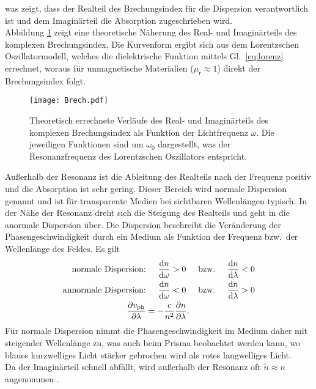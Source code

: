 was zeigt, dass der Realteil des Brechungsindex für die Dispersion verantwortlich ist und dem Imaginärteil die Absorption zugeschrieben wird. \\
Abbildung \ref{fig:brech} zeigt eine theoretische Näherung des Real- und Imaginärteils des komplexen Brechungsindex.
Die Kurvenform ergibt sich aus dem Lorentzschen Oszillatormodell, welches die dielektrische Funktion mittels Gl.~\eqref{eq:lorenz}
errechnet, woraus für unmagnetische Materialien ($\mu_{\text{r}} \approx 1$) direkt der Brechungsindex folgt. 
\begin{figure}[h!]
    \centering
    \texttt{[image: Brech.pdf]}
    \caption{\label{fig:brech}Theoretisch errechnete Verläufe des Real- und Imaginärteils des 
    komplexen Brechungsindex als Funktion der Lichtfrequenz $\omega$. Die jeweiligen Funktionen 
    sind um $\omega_{0}$ dargestellt, was der Resonanzfrequenz des Lorentzschen Oszillators entspricht.}
\end{figure}\FloatBarrier\newpage
Außerhalb der Resonanz ist die Ableitung des Realteils nach der Frequenz positiv und die Absorption ist 
sehr gering. Dieser Bereich wird normale 
Dispersion genannt und ist für transparente Medien bei sichtbaren Wellenlängen typisch. 
In der Nähe der Resonanz dreht sich die Steigung des Realteils und geht in die anormale Dispersion 
über. Die Dispersion beschreibt die Veränderung der Phasengeschwindigkeit durch ein Medium als Funktion 
der Frequenz bzw.~der Wellenlänge des Feldes. Es gilt
\begin{align}
    \text{normale Dispersion:}&\hspace{0.5cm}\frac{\text{d}n}{\text{d}\omega} > 0\hspace{0.5cm}\text{bzw.}\hspace{0.5cm}\frac{\text{d}n}{\text{d}\lambda} < 0 \\
    \text{annormale Dispersion:}&\hspace{0.5cm}\frac{\text{d}n}{\text{d}\omega} < 0\hspace{0.5cm}\text{bzw.}\hspace{0.5cm}\frac{\text{d}n}{\text{d}\lambda} > 0 \\
    \frac{\partial v_{\text{ph}}}{\partial \lambda} &= - \frac{c}{n^{2}}\frac{\partial n}{\partial \lambda}.
\end{align}
Für normale Dispersion nimmt die Phasengeschwindigkeit im Medium daher mit steigender Wellenlänge zu, was auch beim Prisma 
beobachtet werden kann, wo blaues kurzwelliges Licht stärker gebrochen wird als rotes langwelliges Licht. \\
Da der Imaginärteil schnell abfällt, wird außerhalb der Resonanz oft $\tilde{n} \approx n$ angenommen \cite{EPC,Demtroder,Gekle}. \\